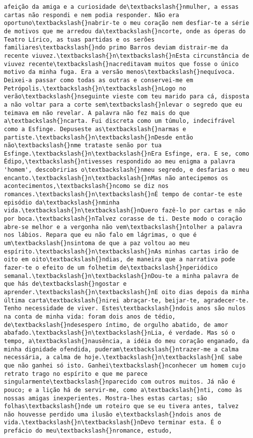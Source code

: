 \begin{Verbatim}[commandchars=\\\{\}]
afeição da amiga e a curiosidade de\textbackslash{}nmulher, a essas cartas não respondi e nem podia responder. Não era oportuno\textbackslash{}nabrir-te o meu coração nem desfiar-te a série de motivos que me arredou da\textbackslash{}ncorte, onde as óperas do Teatro Lírico, as tuas partidas e os serões familiares\textbackslash{}ndo primo Barros deviam distrair-me da recente viuvez.\textbackslash{}n\textbackslash{}nEsta circunstância de viuvez recente\textbackslash{}nacreditavam muitos que fosse o único motivo da minha fuga. Era a versão menos\textbackslash{}nequívoca. Deixei-a passar como todas as outras e conservei-me em Petrópolis.\textbackslash{}n\textbackslash{}nLogo no verão\textbackslash{}nseguinte vieste com teu marido para cá, disposta a não voltar para a corte sem\textbackslash{}nlevar o segredo que eu teimava em não revelar. A palavra não fez mais do que a\textbackslash{}ncarta. Fui discreta como um túmulo, indecifrável como a Esfinge. Depuseste as\textbackslash{}narmas e partiste.\textbackslash{}n\textbackslash{}nDesde então não\textbackslash{}nme trataste senão por tua Esfinge.\textbackslash{}n\textbackslash{}nEra Esfinge, era. E se, como Édipo,\textbackslash{}ntivesses respondido ao meu enigma a palavra 'homem', descobririas o\textbackslash{}nmeu segredo, e desfarias o meu encanto.\textbackslash{}n\textbackslash{}nMas não antecipemos os acontecimentos,\textbackslash{}ncomo se diz nos romances.\textbackslash{}n\textbackslash{}nÉ tempo de contar-te este episódio da\textbackslash{}nminha vida.\textbackslash{}n\textbackslash{}nQuero fazê-lo por cartas e não por boca.\textbackslash{}nTalvez corasse de ti. Deste modo o coração abre-se melhor e a vergonha não vem\textbackslash{}ntolher a palavra nos lábios. Repara que eu não falo em lágrimas, o que é um\textbackslash{}nsintoma de que a paz voltou ao meu espírito.\textbackslash{}n\textbackslash{}nAs minhas cartas irão de oito em oito\textbackslash{}ndias, de maneira que a narrativa pode fazer-te o efeito de um folhetim de\textbackslash{}nperiódico semanal.\textbackslash{}n\textbackslash{}nDou-te a minha palavra de que hás de\textbackslash{}ngostar e aprender.\textbackslash{}n\textbackslash{}nE oito dias depois da minha última carta\textbackslash{}nirei abraçar-te, beijar-te, agradecer-te. Tenho necessidade de viver. Estes\textbackslash{}ndois anos são nulos na conta de minha vida: foram dois anos de tédio, de\textbackslash{}ndesespero íntimo, de orgulho abatido, de amor abafado.\textbackslash{}n\textbackslash{}nLia, é verdade. Mas só o tempo, a\textbackslash{}nausência, a idéia do meu coração enganado, da minha dignidade ofendida, puderam\textbackslash{}ntrazer-me a calma necessária, a calma de hoje.\textbackslash{}n\textbackslash{}nE sabe que não ganhei só isto. Ganhei\textbackslash{}nconhecer um homem cujo retrato trago no espírito e que me parece singularmente\textbackslash{}nparecido com outros muitos. Já não é pouco; e a lição há de servir-me, como a\textbackslash{}nti, como às nossas amigas inexperientes. Mostra-lhes estas cartas; são folhas\textbackslash{}nde um roteiro que se eu tivera antes, talvez não houvesse perdido uma ilusão e\textbackslash{}ndois anos de vida.\textbackslash{}n\textbackslash{}nDevo terminar esta. É o prefácio do meu\textbackslash{}nromance, estudo, 
\end{Verbatim}
